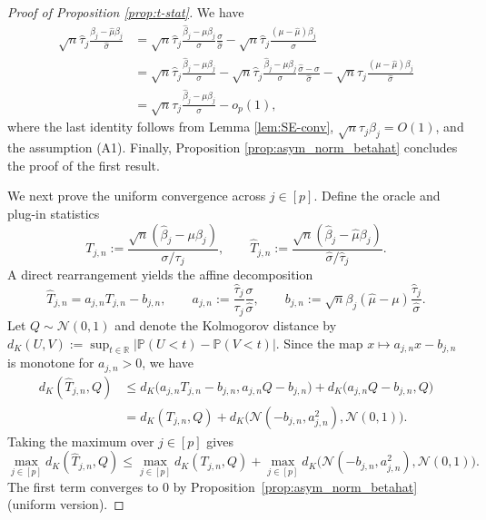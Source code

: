 \documentclass[12pt,reqno]{amsart}
\newcommand{\R}{\mathbb{R}}
\newcommand{\pr}{\mathbb{P}}
\newcommand{\cc}{\color{black}}
\renewcommand{\hat}{\widehat}
\begin{document}
\begin{proof}[Proof of Proposition \ref{prop:t-stat}] 
We have
\begin{align*}
    \sqrt{n}\hat\tau_j\frac{\hat{\beta}_j-\hat{\mu}\beta_j}{\hat{\sigma}}
    &=\sqrt{n}\hat\tau_j\frac{\hat{\beta}_j-\mu\beta_j}{{\sigma}}\frac{\sigma}{\hat{\sigma}}-\sqrt{n}\hat\tau_j\frac{(\mu-\hat{\mu})\beta_j}{\hat{\sigma}}\\
    &=\sqrt{n}\hat\tau_j\frac{\hat{\beta}_j-\mu\beta_j}{{\sigma}}-\sqrt{n}\hat\tau_j\frac{\hat{\beta}_j-\mu\beta_j}{{\sigma}}\frac{\hat{\sigma}-\sigma}{\hat{\sigma}}-\sqrt{n}\hat\tau_j\frac{(\mu-\hat{\mu})\beta_j}{\hat{\sigma}}\\
    &=\sqrt{n}\tau_j\frac{\hat{\beta}_j-\mu\beta_j}{{\sigma}}-o_p(1),
\end{align*}
where the last identity follows from Lemma \ref{lem:SE-conv}, $\sqrt{n}\tau_j\beta_j=O(1)$, and the assumption (A1). Finally, Proposition \ref{prop:asym_norm_betahat} concludes the proof of the first result.

{\cc
We next prove the uniform convergence across $j\in[p]$.
Define the oracle and plug-in statistics
\[
T_{j,n}:=\frac{\sqrt{n}(\hat\beta_j-\mu\beta_j)}{\sigma/\tau_j},
\qquad
\hat T_{j,n}:=\frac{\sqrt{n}(\hat\beta_j-\hat\mu\beta_j)}{\hat\sigma/\hat\tau_j}.
\]
A direct rearrangement yields the affine decomposition
\[
\hat T_{j,n}=a_{j,n} T_{j,n}-b_{j,n},
\qquad
a_{j,n}:=\frac{\hat\tau_j}{\tau_j}\frac{\sigma}{\hat\sigma},
\qquad
b_{j,n}:=\sqrt{n}\beta_j(\hat\mu-\mu)\frac{\hat\tau_j}{\hat\sigma}.
\]
Let $Q\sim\mathcal{N}(0,1)$ and denote the Kolmogorov distance by
$d_K(U,V):=\sup_{t\in\R}|\pr(U<t)-\pr(V<t)|$.
Since the map $x\mapsto a_{j,n}x-b_{j,n}$ is monotone for $a_{j,n}>0$, we have
\begin{align}
    d_K(\hat T_{j,n},Q)
&\le d_K\big(a_{j,n}T_{j,n}-b_{j,n}, a_{j,n}Q-b_{j,n}\big)
     +d_K\big(a_{j,n}Q-b_{j,n}, Q\big)\\
&= d_K(T_{j,n},Q) + d_K\big(\mathcal{N}(-b_{j,n},a_{j,n}^2), \mathcal{N}(0,1)\big).
\end{align}
Taking the maximum over $j\in[p]$ gives
\[
\max_{j\in[p]} d_K(\hat T_{j,n},Q)
\le
\max_{j\in[p]} d_K(T_{j,n},Q)
+
\max_{j\in[p]} d_K\big(\mathcal{N}(-b_{j,n},a_{j,n}^2), \mathcal{N}(0,1)\big).
\]
The first term converges to $0$ by Proposition~\ref{prop:asym_norm_betahat} (uniform version).

}
\end{proof}
\end{document}
